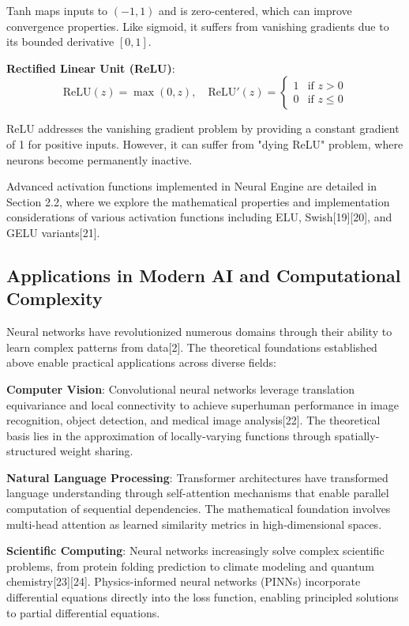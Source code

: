 \documentclass[11pt,a4paper]{report}
\begin{document}
Tanh maps inputs to $(-1, 1)$ and is zero-centered, which can improve convergence properties. Like sigmoid, it suffers from vanishing gradients due to its bounded derivative $[0, 1]$.

\textbf{Rectified Linear Unit (ReLU)}:
\begin{equation}
\text{ReLU}(z) = \max(0, z), \quad \text{ReLU}'(z) = \begin{cases} 1 & \text{if } z > 0 \\ 0 & \text{if } z \leq 0 \end{cases}
\end{equation}

ReLU addresses the vanishing gradient problem by providing a constant gradient of 1 for positive inputs. However, it can suffer from "dying ReLU" problem, where neurons become permanently inactive.

Advanced activation functions implemented in Neural Engine are detailed in Section 2.2, where we explore the mathematical properties and implementation considerations of various activation functions including ELU, Swish[19][20], and GELU variants[21].

\subsection{Applications in Modern AI and Computational Complexity}

Neural networks have revolutionized numerous domains through their ability to learn complex patterns from data[2]. The theoretical foundations established above enable practical applications across diverse fields:

\textbf{Computer Vision}: Convolutional neural networks leverage translation equivariance and local connectivity to achieve superhuman performance in image recognition, object detection, and medical image analysis[22]. The theoretical basis lies in the approximation of locally-varying functions through spatially-structured weight sharing.

\textbf{Natural Language Processing}: Transformer architectures have transformed language understanding through self-attention mechanisms that enable parallel computation of sequential dependencies. The mathematical foundation involves multi-head attention as learned similarity metrics in high-dimensional spaces.

\textbf{Scientific Computing}: Neural networks increasingly solve complex scientific problems, from protein folding prediction to climate modeling and quantum chemistry[23][24]. Physics-informed neural networks (PINNs) incorporate differential equations directly into the loss function, enabling principled solutions to partial differential equations.
\end{document}
